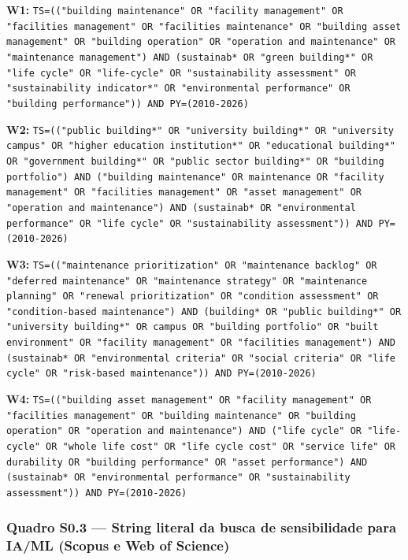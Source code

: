 \small
\noindent\textbf{W1:} \texttt{TS=(("building maintenance" OR "facility management" OR "facilities management" OR "facilities maintenance" OR "building asset management" OR "building operation" OR "operation and maintenance" OR "maintenance management") AND (sustainab* OR "green building*" OR "life cycle" OR "life-cycle" OR "sustainability assessment" OR "sustainability indicator*" OR "environmental performance" OR "building performance")) AND PY=(2010-2026)}

\medskip
\noindent\textbf{W2:} \texttt{TS=(("public building*" OR "university building*" OR "university campus" OR "higher education institution*" OR "educational building*" OR "government building*" OR "public sector building*" OR "building portfolio") AND ("building maintenance" OR maintenance OR "facility management" OR "facilities management" OR "asset management" OR "operation and maintenance") AND (sustainab* OR "environmental performance" OR "life cycle" OR "sustainability assessment")) AND PY=(2010-2026)}

\medskip
\noindent\textbf{W3:} \texttt{TS=(("maintenance prioritization" OR "maintenance backlog" OR "deferred maintenance" OR "maintenance strategy" OR "maintenance planning" OR "renewal prioritization" OR "condition assessment" OR "condition-based maintenance") AND (building* OR "public building*" OR "university building*" OR campus OR "building portfolio" OR "built environment" OR "facility management" OR "facilities management") AND (sustainab* OR "environmental criteria" OR "social criteria" OR "life cycle" OR "risk-based maintenance")) AND PY=(2010-2026)}

\medskip
\noindent\textbf{W4:} \texttt{TS=(("building asset management" OR "facility management" OR "facilities management" OR "building maintenance" OR "building operation" OR "operation and maintenance") AND ("life cycle" OR "life-cycle" OR "whole life cost" OR "life cycle cost" OR "service life" OR durability OR "building performance" OR "asset performance") AND (sustainab* OR "environmental performance" OR "sustainability assessment")) AND PY=(2010-2026)}

\subsubsection*{Quadro S0.3 --- String literal da busca de sensibilidade para IA/ML (Scopus e Web of Science)}

